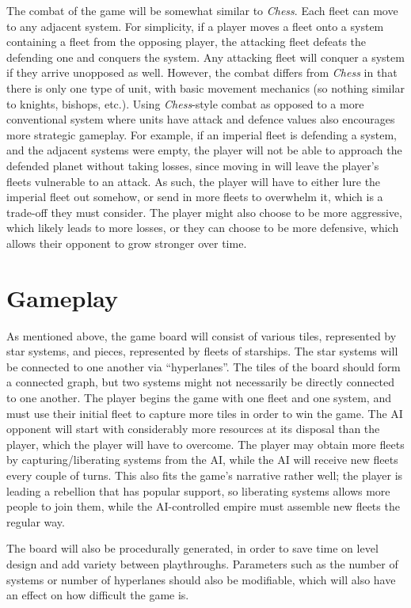 \documentclass[10pt]{article}
\begin{document}
The combat of the game will be somewhat similar to \textit{Chess}. Each fleet can move to any adjacent system.
For simplicity, if a player moves a fleet onto a system containing a fleet from the opposing player, the attacking
fleet defeats the defending one and conquers the system. Any attacking fleet will conquer a system if they arrive unopposed as well.
However, the combat differs from \textit{Chess} in that there is only one type of unit, with basic movement mechanics (so nothing
similar to knights, bishops, etc.). Using \textit{Chess}-style combat as opposed to a more conventional system where units have attack
and defence values also encourages more strategic gameplay. For example, if an imperial fleet is defending a system,
and the adjacent systems were empty, the player will not be able to approach the defended planet without taking losses,
since moving in will leave the player's fleets vulnerable to an attack. As such, the player will have to either lure the imperial fleet out somehow,
or send in more fleets to overwhelm it, which is a trade-off they must consider. The player might also choose to be more aggressive,
which likely leads to more losses, or they can choose to be more defensive, which allows their opponent to grow stronger over time.

\section{Gameplay}

As mentioned above, the game board will consist of various tiles, represented by star systems, and pieces, represented by
fleets of starships. The star systems will be connected to one another via ``hyperlanes''.
The tiles of the board should form a connected graph, but two systems might not necessarily be directly connected to one another.
The player begins the game with one fleet and one system, and must use their initial fleet to capture
more tiles in order to win the game. The AI opponent will start with considerably more resources at its disposal than the player,
which the player will have to overcome. The player may obtain more fleets by capturing/liberating systems from the AI,
while the AI will receive new fleets every couple of turns. This also fits the game's narrative rather well; the player is leading
a rebellion that has popular support, so liberating systems allows more people to join them, while the AI-controlled empire must
assemble new fleets the regular way.

The board will also be procedurally generated, in order to save time on level design and add variety between playthroughs.
Parameters such as the number of systems or number of hyperlanes should also be modifiable, which will also have an effect
on how difficult the game is.
\end{document}
